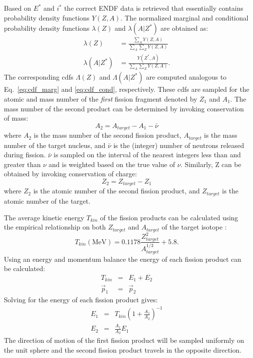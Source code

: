 \documentclass{anstrans}
\begin{document}
Based on $E^*$ and $i^*$ the correct ENDF data is retrieved that essentially contains probability density functions $Y(Z,A)$.
The normalized marginal and conditional probability density functions $\lambda(Z)$ and $\lambda(A | Z^*)$ are obtained as:
\begin{align}
   \lambda(Z) & = \frac{\sum\limits_{A} Y(Z,A)}{\sum\limits_{A}\sum\limits_{Z}  Y(Z,A)} \nonumber \\
  \lambda(A | Z^*)&= \frac{ Y(Z^*, A)}{\sum\limits_{A}\sum\limits_{Z}  Y(Z,A)}.
\end{align}
The corresponding cdfs $\Lambda(Z)$ and $\Lambda(A | Z^*)$ are computed analogous to Eq.~\eqref{eq:cdf_marg} and \eqref{eq:cdf_cond}, respectively. These cdfs are sampled
for the atomic and mass number of the {\em first} fission fragment denoted by $Z_1$ and $A_1$.
The mass number of the second product can be determined by invoking conservation of mass:
\begin{equation}
  A_{2} = A_{target} - A_{1} - \bar \nu
\end{equation}
where $A_{2}$ is the mass number of the second fission product, $A_{target}$ is the mass number of the target nucleus, and
$\bar \nu$ is the (integer) number of neutrons released during fission. $\bar \nu$ is sampled on the interval of the nearest integers less than and greater than $\nu$ and is weighted based on the true value of $\nu$.
Similarly, Z can be obtained by invoking conservation of charge:
\begin{equation}
  Z_{2} = Z_{target} - Z_{1}
\end{equation}
where $Z_{2}$ is the atomic number of the second fission product, and $Z_{target}$ is the atomic number of the target.

The average kinetic energy $T_{kin}$ of the fission products can be calculated using the empirical relationship
on both $Z_{target}$ and $A_{target}$ of the target isotope \cite{geant}:
\begin{equation}
  T_{kin} (\text{MeV})= 0.1178 \frac{Z_{target}^2}{A_{target}^{1/3}} + 5.8.
\end{equation}
Using an energy and momentum balance the energy of each fission product can be calculated:
\begin{eqnarray}
  T_{kin} &=& E_{1} + E_{2} \\
  \vec p_{1} &=& \vec p_{2}
\end{eqnarray}
Solving for the energy of each fission product gives:
\begin{eqnarray}
  E_{1} &=& T_{kin}\left(1 +  \frac{A_{1}}{A_{2}}\right)^{-1}\\
  E_{2} &=& \frac{A_{1}}{A_{2}}E_{1}
\end{eqnarray}
The direction of motion of the first fission product will be sampled uniformly on the unit sphere and the second
fission product travels in the opposite direction.
\end{document}
